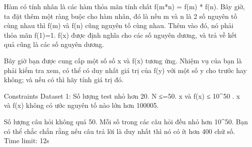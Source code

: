 Hàm có tính nhân là các hàm thỏa mãn tính chất f(m*n) = f(m) * f(n). Bây giờ, ta đặt thêm một ràng buộc cho hàm nhân, đó là nếu m và n là 2 số nguyên tố cùng nhau thì f(m) và f(n) cũng nguyên tố cùng nhau. Thêm vào đó, nó phải thỏa mãn f(1)=1. f(x) được định nghĩa cho các số nguyên dương, và trả về kết quả cũng là các số nguyên dương.  

   Bây giờ bạn được cung cấp một số số x và f(x) tương ứng. Nhiệm vụ của bạn là phải kiểm tra xem, có thể có duy nhất giá trị của f(y) với một số y cho trước hay không; và nếu có thì hãy tính giá trị đó.  

Constraints
Dataset 1: Số lượng test nhỏ hơn 20. N ≤=50. x và f(x) ≤ 10^50 . x và f(x) không có ước nguyên tố nào lớn hơn 100005.  

   Số lượng câu hỏi không quá 50. Mỗi số trong các câu hỏi đều nhỏ hơn 10^50. Bạn có thể chắc chắn rằng nếu câu trả lời là duy nhất thì nó có ít hơn 400 chữ số. Time limit: 12s